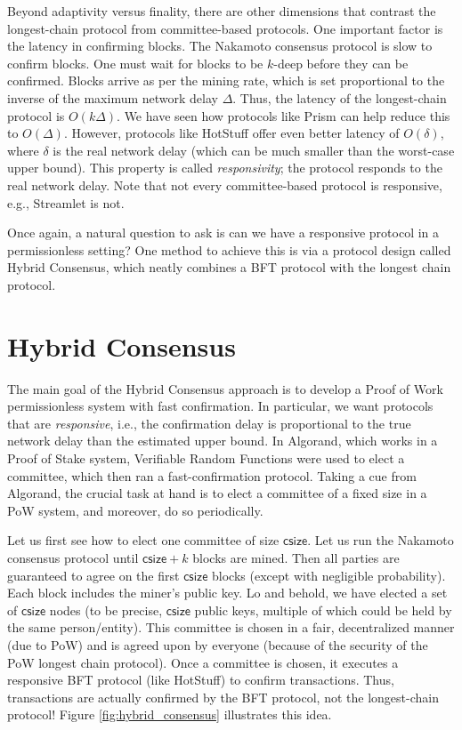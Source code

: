 \documentclass{article}
\begin{document}
Beyond adaptivity versus finality, there are  other dimensions that contrast the longest-chain protocol from committee-based protocols. One important factor is the latency in confirming blocks. The Nakamoto consensus protocol is slow to confirm blocks. One must wait for blocks to be $k$-deep before they can be confirmed. Blocks arrive as per the mining rate, which is set proportional to the inverse of the maximum network delay $\Delta$. Thus, the latency of the longest-chain protocol is $O(k\Delta)$. We have seen how protocols like Prism can help reduce this to $O(\Delta)$. However, protocols like HotStuff offer even better latency of $O(\delta)$, where $\delta$ is the real network delay (which can be much smaller than the worst-case upper bound). This property is called  \textit{responsivity}; the protocol responds to the real network delay. Note that not every committee-based protocol is responsive, e.g., Streamlet is not.

Once again, a natural question to ask is can we have a responsive protocol in a permissionless setting? %
One method to achieve this is via a protocol design called {\sf Hybrid Consensus}, which neatly combines a BFT protocol with the longest chain protocol. 

\section*{{\sf Hybrid Consensus}}
The main goal of the {\sf Hybrid Consensus} approach is to develop a Proof of Work permissionless system with fast confirmation. In particular, we want protocols that are \textit{responsive}, i.e., the confirmation delay is proportional to the true network delay than the estimated upper bound. In Algorand, which works in a Proof of Stake system, Verifiable Random Functions were used to elect a committee, which then ran a fast-confirmation protocol. Taking a cue from Algorand, the crucial task at hand is to elect a committee of a fixed size in a PoW system, and moreover, do so periodically.

Let us first see how to elect one committee of size $\textsf{csize}$. Let us run the Nakamoto consensus protocol until $\textsf{csize} + k$ blocks are mined. Then all parties are guaranteed to agree on the first $\textsf{csize}$ blocks (except with negligible probability). Each block includes the miner's public key. Lo and behold, we have elected a set of $\textsf{csize}$ nodes (to be precise, $\textsf{csize}$ public keys, multiple of which could be held by the same person/entity). This committee is chosen in a fair, decentralized manner (due to PoW) and is agreed upon by everyone (because of the security of the PoW longest chain protocol). Once a committee is chosen, it executes a responsive BFT protocol (like HotStuff) to confirm transactions. Thus, transactions are actually confirmed by the BFT protocol, not the longest-chain protocol! Figure \ref{fig:hybrid_consensus} illustrates this idea.
\end{document}
